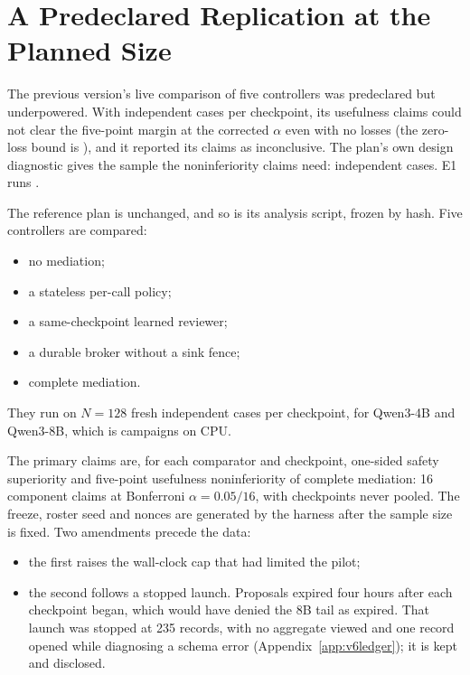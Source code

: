 \section{A Predeclared Replication at the Planned Size}\label{sec:v6replication}

The previous version's live comparison of five controllers was predeclared but underpowered. With \vsixPilotN{}
independent cases per checkpoint, its usefulness claims could not clear the five-point margin at the corrected
\(\alpha\) even with no losses (the zero-loss bound is \vsixPilotZeroLossBound), and it reported its claims as
inconclusive. The plan's own design diagnostic gives the sample the noninferiority claims need: \vsixEOneMinN{}
independent cases. E1 runs \vsixEOneN.

 The reference plan is unchanged, and so is its analysis script, frozen by hash. Five controllers are compared:
\begin{itemize}
  \item no mediation;
  \item a stateless per-call policy;
  \item a same-checkpoint learned reviewer;
  \item a durable broker without a sink fence;
  \item complete mediation.
\end{itemize}
They run on \(N = 128\) fresh independent cases per checkpoint, for Qwen3-4B and Qwen3-8B, which is
\vsixEOneCampaigns{} campaigns on CPU.

The primary claims are, for each comparator and checkpoint, one-sided safety superiority and five-point usefulness
noninferiority of complete mediation: 16 component claims at Bonferroni \(\alpha = 0.05/16\), with checkpoints never
pooled. The freeze, roster seed and nonces are generated by the harness after the sample size is fixed. Two amendments
precede the data:
\begin{itemize}
  \item the first raises the wall-clock cap that had limited the pilot;
  \item the second follows a stopped launch. Proposals expired four hours after each checkpoint began, which would
        have denied the 8B tail as expired. That launch was stopped at 235 records, with no aggregate viewed and one record opened while
        diagnosing a schema error (Appendix~\ref{app:v6ledger}); it is kept and disclosed.
\end{itemize}

